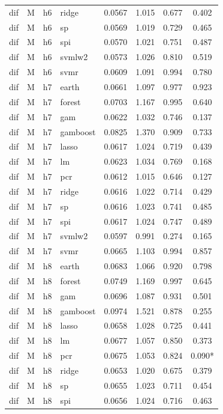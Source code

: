 \begin{ThreePartTable}
\begin{longtable}[t]{llclcccc}
dif & M & h6 & ridge & 0.0567 & 1.015 & 0.677 & 0.402\\
dif & M & h6 & sp & 0.0569 & 1.019 & 0.729 & 0.465\\
dif & M & h6 & spi & 0.0570 & 1.021 & 0.751 & 0.487\\
dif & M & h6 & svmlw2 & 0.0573 & 1.026 & 0.810 & 0.519\\
dif & M & h6 & svmr & 0.0609 & 1.091 & 0.994 & 0.780\\
\addlinespace
dif & M & h7 & earth & 0.0661 & 1.097 & 0.977 & 0.923\\
dif & M & h7 & forest & 0.0703 & 1.167 & 0.995 & 0.640\\
dif & M & h7 & gam & 0.0622 & 1.032 & 0.746 & 0.137\\
dif & M & h7 & gamboost & 0.0825 & 1.370 & 0.909 & 0.733\\
dif & M & h7 & lasso & 0.0617 & 1.024 & 0.719 & 0.439\\
dif & M & h7 & lm & 0.0623 & 1.034 & 0.769 & 0.168\\
dif & M & h7 & pcr & 0.0612 & 1.015 & 0.646 & 0.127\\
dif & M & h7 & ridge & 0.0616 & 1.022 & 0.714 & 0.429\\
dif & M & h7 & sp & 0.0616 & 1.023 & 0.741 & 0.485\\
dif & M & h7 & spi & 0.0617 & 1.024 & 0.747 & 0.489\\
dif & M & h7 & svmlw2 & 0.0597 & 0.991 & 0.274 & 0.165\\
dif & M & h7 & svmr & 0.0665 & 1.103 & 0.994 & 0.857\\
\addlinespace
dif & M & h8 & earth & 0.0683 & 1.066 & 0.920 & 0.798\\
dif & M & h8 & forest & 0.0749 & 1.169 & 0.997 & 0.645\\
dif & M & h8 & gam & 0.0696 & 1.087 & 0.931 & 0.501\\
dif & M & h8 & gamboost & 0.0974 & 1.521 & 0.878 & 0.255\\
dif & M & h8 & lasso & 0.0658 & 1.028 & 0.725 & 0.441\\
dif & M & h8 & lm & 0.0677 & 1.057 & 0.850 & 0.373\\
dif & M & h8 & pcr & 0.0675 & 1.053 & 0.824 & 0.090*\\
dif & M & h8 & ridge & 0.0653 & 1.020 & 0.675 & 0.379\\
dif & M & h8 & sp & 0.0655 & 1.023 & 0.711 & 0.454\\
dif & M & h8 & spi & 0.0656 & 1.024 & 0.716 & 0.463\\

\end{longtable}
\end{ThreePartTable}
